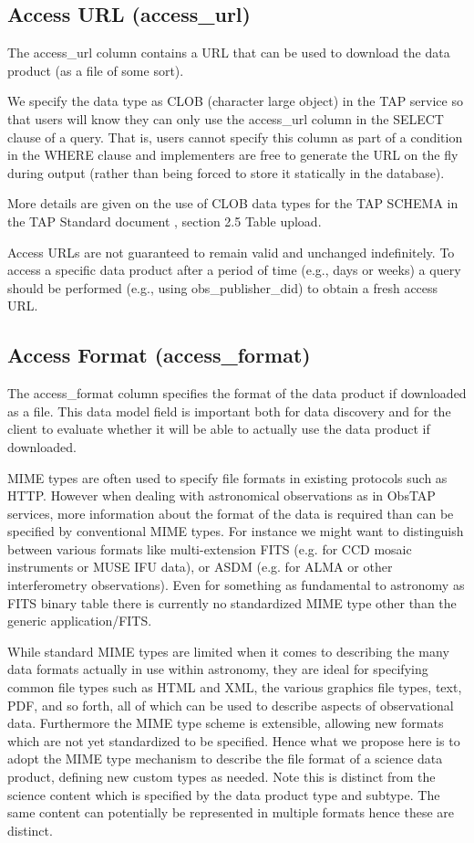 \documentclass[11pt,a4paper]{ivoa}
\begin{document}
\subsection{Access URL (access\_url)}
The access\_url column contains a URL that can be used to download the data product (as a file of some sort).

We specify the data type as CLOB (character large object) in the TAP service so that users will know they can only use
the access\_url column in the SELECT clause of a query.  That is, users cannot specify this column as part of a
condition in the WHERE clause and implementers are free to generate the URL on the fly during output (rather than being
forced to store it statically in the database).

More details are given on the use of CLOB data types for the TAP SCHEMA in the TAP Standard document
\cite{2010ivoa.spec.0327D}, section 2.5 Table upload.

Access URLs are not guaranteed to remain valid and unchanged indefinitely.  To access a specific data product after a
period of time (e.g., days or weeks) a query should be performed (e.g., using obs\_publisher\_did) to obtain a fresh
access URL.

\subsection{Access Format (access\_format)}
\label{bkm:Ref289893457}The access\_format column specifies the format of the data product if downloaded as a file. This
data model field is important both for data discovery and for the client to evaluate whether it will be able to
actually use the data product if downloaded.

MIME types are often used to specify file formats in existing protocols such as HTTP\cite{CITATIONIntl1036}.  However
when dealing with astronomical observations as in ObsTAP services, more information about the format of the data is
required than can be specified by conventional MIME types.  For instance we might want to distinguish between various
formats like multi-extension FITS (e.g. for CCD mosaic instruments or MUSE IFU data), or ASDM (e.g. for ALMA or other
interferometry observations).  Even for something as fundamental to astronomy as FITS binary table there is currently
no standardized MIME type other than the generic application/FITS.

While standard MIME types are limited when it comes to describing the many data formats actually in use within
astronomy, they are ideal for specifying common file types such as HTML and XML, the various graphics file types, text,
PDF, and so forth, all of which can be used to describe aspects of observational data.  Furthermore the MIME type
scheme is extensible, allowing new formats which are not yet standardized to be specified.  Hence what we propose here
is to adopt the MIME type mechanism to describe the file format of a science data product, defining new custom types as
needed.  Note this is distinct from the science content which is specified by the data product type and subtype.  The
same content can potentially be represented in multiple formats hence these are distinct.
\end{document}
